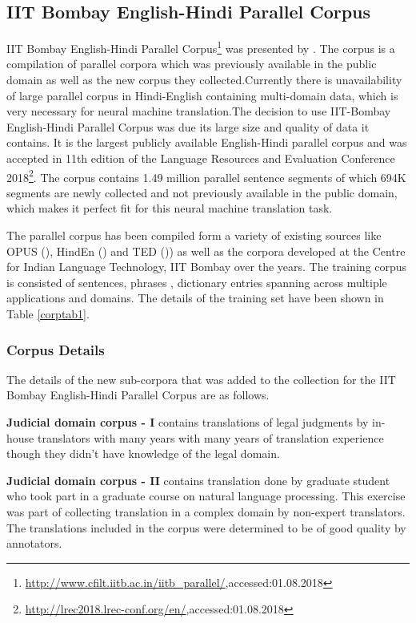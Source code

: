 \subsection{IIT Bombay English-Hindi Parallel Corpus}
IIT Bombay English-Hindi Parallel Corpus\footnote{\url{http://www.cfilt.iitb.ac.in/iitb_parallel/},accessed:01.08.2018} was presented by \cite{Kunchukuttan2018TheIB}. The corpus is a compilation of parallel corpora which was previously available in the public domain as well as the new corpus they collected.Currently there is unavailability of large parallel corpus in Hindi-English containing multi-domain data, which is very necessary for neural machine translation.The decision to use IIT-Bombay English-Hindi Parallel Corpus was due its large size and quality of data it contains. It is the largest publicly available English-Hindi parallel corpus and was accepted in 11th edition of the Language Resources and Evaluation Conference 2018\footnote{\url{http://lrec2018.lrec-conf.org/en/},accessed:01.08.2018}. The corpus contains 1.49 million parallel sentence segments of which 694K segments are newly collected and not previously available in the public domain, which makes it perfect fit for this neural machine translation task. 

The parallel corpus has been compiled form a variety of existing sources like OPUS (\cite{TIEDEMANN12.463}), HindEn (\cite{11858/00-097C-0000-0023-625F-0}) and TED (\cite{Abdelali2014TheAC})) as well as the corpora developed at the Centre for Indian Language Technology, IIT Bombay over the years. The training corpus is consisted of sentences, phrases , dictionary entries spanning across multiple applications and domains. The details of the training set have been shown in Table \ref{corptab1}.

\subsubsection{Corpus Details}
The details of the new sub-corpora that was added to the collection for the IIT Bombay English-Hindi Parallel Corpus are as follows.

\textbf{Judicial domain corpus - I} contains translations of legal judgments by in-house translators with many years with many years of translation experience though they didn’t have knowledge of the legal domain.

\textbf{Judicial domain corpus - II} contains translation done by graduate student who took part in a graduate course on natural language processing. This exercise was part of collecting translation in a complex domain by non-expert translators. The translations included in the corpus were determined to be of good quality by annotators.

